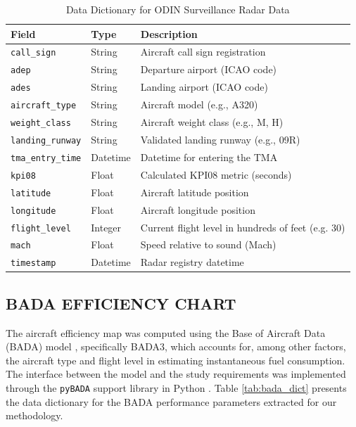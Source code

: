\begin{table}[htbp]
\caption{Data Dictionary for ODIN Surveillance Radar Data}
\label{tab:odin_dict}
\centering
\begin{tabular}{m{} m{} m{}}
\hline
\textbf{Field} & \textbf{Type} & \textbf{Description} \\
\hline
\texttt{call\_sign} & String & Aircraft call sign registration \\
\texttt{adep} & String & Departure airport (ICAO code) \\
\texttt{ades} & String & Landing airport (ICAO code) \\
\texttt{aircraft\_type} & String & Aircraft model (e.g., A320) \\
\texttt{weight\_class} & String & Aircraft weight class (e.g., M, H) \\
\texttt{landing\_runway} & String & Validated landing runway (e.g., 09R) \\
\texttt{tma\_entry\_time} & Datetime & Datetime for entering the TMA \\
\texttt{kpi08} & Float & Calculated KPI08 metric (seconds) \\
\texttt{latitude} & Float & Aircraft latitude position \\
\texttt{longitude} & Float & Aircraft longitude position \\
\texttt{flight\_level} & Integer & Current flight level in hundreds of feet (e.g. 30) \\
\texttt{mach} & Float & Speed relative to sound (Mach) \\
\texttt{timestamp} & Datetime & Radar registry datetime \\
\hline
\end{tabular}
\end{table}

\subsection{BADA EFFICIENCY CHART}
The aircraft efficiency map was computed using the Base of Aircraft Data (BADA) model \cite{bada_a320}, specifically BADA3, which accounts for, among other factors, the aircraft type and flight level in estimating instantaneous fuel consumption. The interface between the model and the study requirements was implemented through the \texttt{pyBADA} support library in Python \cite{pybada}. Table \ref{tab:bada_dict} presents the data dictionary for the BADA performance parameters extracted for our methodology.

